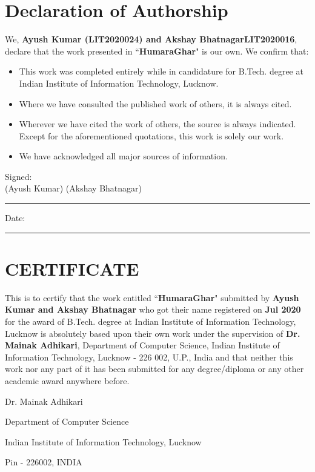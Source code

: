 \thispagestyle{empty}

\setcounter{page}{3}

\chapter*{Declaration of Authorship}

\vspace{1cm}

\noindent
We, \textbf{Ayush Kumar (LIT2020024) and Akshay Bhatnagar{LIT2020016}}, declare that the work presented in ``\textbf{HumaraGhar}" is our own. We confirm that:

\medskip

\begin{itemize}
      \item This work was completed entirely while in candidature for B.Tech. degree at Indian Institute of Information Technology, Lucknow.

            \medskip

      \item Where we have consulted the published work of others, it is always cited.

            \medskip

      \item Wherever we have cited the work of others, the source is always indicated. Except for the aforementioned quotations, this work is solely our work.

            \medskip

      \item We have acknowledged all major sources of information.
\end{itemize}

\vspace{2cm}

\noindent Signed:\\

\hspace{1.5cm}(Ayush Kumar) \hfill (Akshay Bhatnagar)
\rule[0.5em]{33em}{0.5pt}

\noindent Date:\\
\rule[0.5em]{33em}{0.5pt}

\cleardoublepage

\chapter*{CERTIFICATE}

This is to certify that the work entitled ``\textbf{HumaraGhar}" submitted by \textbf{Ayush Kumar and Akshay Bhatnagar} who got their name registered on \textbf{\;\;\; Jul 2020} for the award of B.Tech. degree at Indian Institute of Information Technology, Lucknow is absolutely based upon their own work under the supervision of \textbf{Dr. Mainak Adhikari}, Department of Computer Science, Indian Institute of Information Technology, Lucknow - 226 002, U.P., India and that neither this work nor any part of it has been submitted for any degree/diploma or any other academic award anywhere before.

\vspace{4cm}

\begin{center}
      Dr. Mainak Adhikari

      Department of Computer Science

      Indian Institute of Information Technology, Lucknow

      Pin - 226002, INDIA
\end{center}
